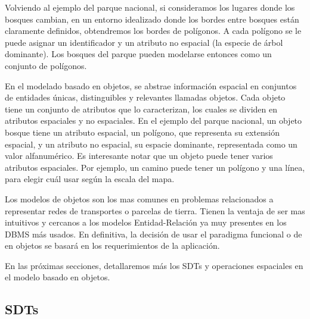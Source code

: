 Volviendo al ejemplo del parque nacional, si consideramos los lugares donde los bosques cambian,
en un entorno idealizado donde los bordes entre bosques están claramente definidos, obtendremos los bordes de polígonos.
A cada polígono se le puede asignar un identificador y un atributo no espacial (la especie de árbol dominante).
Los bosques del parque pueden modelarse entonces como un conjunto de polígonos.

En el modelado basado en objetos, se abstrae información espacial en conjuntos de
entidades únicas, distinguibles y relevantes llamadas objetos.
Cada objeto tiene un conjunto de atributos que lo caracterizan, los cuales se dividen en atributos espaciales y no espaciales.
En el ejemplo del parque nacional, un objeto bosque tiene un atributo espacial, un polígono, que representa su extensión espacial,
y un atributo no espacial, su espacie dominante, representada como un valor alfanumérico.
Es interesante notar que un objeto puede tener varios atributos espaciales.
Por ejemplo, un camino puede tener un polígono y una línea, para elegir cuál usar según la escala del mapa.

Los modelos de objetos son los mas comunes en problemas relacionados a representar redes de transportes o parcelas de tierra.
Tienen la ventaja de ser mas intuitivos y cercanos a los modelos Entidad-Relación ya muy presentes en los DBMS más usados.
En definitiva, la decisión de usar el paradigma funcional o de en objetos se basará en los requerimientos de la aplicación.

En las próximas secciones, detallaremos más los SDTs y operaciones espaciales en el modelo basado en objetos.

\subsection{SDTs}

